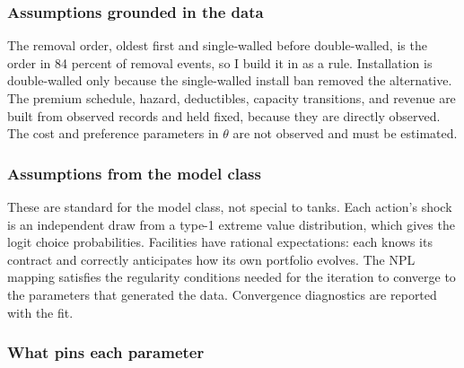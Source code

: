\documentclass[
  12pt,
]{article}
\begin{document}
\subsubsection{Assumptions grounded in the
data}\label{assumptions-grounded-in-the-data}

The removal order, oldest first and single-walled before double-walled,
is the order in 84 percent of removal events, so I build it in as a
rule. Installation is double-walled only because the single-walled
install ban removed the alternative. The premium schedule, hazard,
deductibles, capacity transitions, and revenue are built from observed
records and held fixed, because they are directly observed. The cost and
preference parameters in \(\theta\) are not observed and must be
estimated.

\subsubsection{Assumptions from the model
class}\label{assumptions-from-the-model-class}

These are standard for the model class, not special to tanks. Each
action's shock is an independent draw from a type-1 extreme value
distribution, which gives the logit choice probabilities. Facilities
have rational expectations: each knows its contract and correctly
anticipates how its own portfolio evolves. The NPL mapping satisfies the
regularity conditions needed for the iteration to converge to the
parameters that generated the data. Convergence diagnostics are reported
with the fit.

\subsubsection{What pins each parameter}\label{what-pins-each-parameter}
\end{document}
